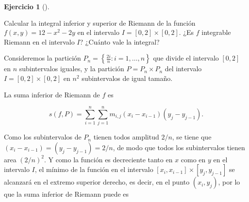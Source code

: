 \documentclass[
  spanish,
  a4paper,
]{scrreport}
\theoremstyle{definition}
\newtheorem{exercise}{Ejercicio}[chapter]
\theoremstyle{remark}
\begin{document}
\begin{exercise}[]\protect\hypertarget{exr-integral-inferior-superior-riemann-n-dimensional}{}\label{exr-integral-inferior-superior-riemann-n-dimensional}

Calcular la integral inferior y superior de Riemann de la función
\(f(x,y)=12-x^2-2y\) en el intervalo \(I=[0,2]\times[0,2]\). ¿Es \(f\)
integrable Riemann en el intervalo \(I\)? ¿Cuánto vale la integral?

\end{exercise}

\begin{tcolorbox}[enhanced jigsaw, arc=.35mm, bottomrule=.15mm, bottomtitle=1mm, breakable, colback=white, colbacktitle=quarto-callout-tip-color!10!white, colframe=quarto-callout-tip-color-frame, coltitle=black, left=2mm, leftrule=.75mm, opacityback=0, opacitybacktitle=0.6, rightrule=.15mm, title=\textcolor{quarto-callout-tip-color}{\faLightbulb}\hspace{0.5em}{Solución}, titlerule=0mm, toprule=.15mm, toptitle=1mm]

Consideremos la partición
\(P_n = \left\{\frac{2i}{n}: i=1,\ldots,n\right\}\) que divide el
intervalo \([0,2]\) en \(n\) subintervalos iguales, y la partición
\(P=P_n\times P_n\) del intervalo \(I=[0,2]\times[0,2]\) en \(n^2\)
subintervalos de igual tamaño.

La suma inferior de Riemann de \(f\) es

\[
s(f,P) = \sum_{i=1}^n\sum_{j=1}^n m_{i,j} (x_i-x_{i-1})(y_j-y_{j-1}).
\]

Como los subintervalos de \(P_n\) tienen todos amplitud \(2/n\), se
tiene que \((x_i-x_{i-1}) = (y_j-y_{j-1}) = 2/n\), de modo que todos los
subintervalos tienen area \((2/n)^2\). Y como la función es decreciente
tanto en \(x\) como en \(y\) en el intervalo \(I\), el mínimo de la
función en el intervalo \([x_i,x_{i-1}]\times[y_j,y_{j-1}]\) se
alcanzará en el extremo superior derecho, es decir, en el punto
\((x_i,y_j)\), por lo que la suma inferior de Riemann puede es


\end{tcolorbox}
\end{document}
